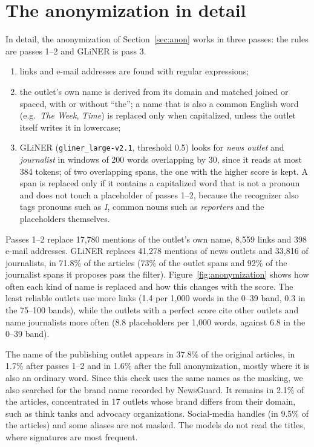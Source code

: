 \documentclass[11pt,a4paper]{article}
\begin{document}
\section{The anonymization in detail}\label{app:anonfig}
In detail, the anonymization of Section~\ref{sec:anon} works in three passes: the rules are passes 1--2 and GLiNER is
pass 3.
\begin{enumerate}
  \item links and e-mail addresses are found with regular expressions;
  \item the outlet's own name is derived from its domain and matched joined or spaced, with or without ``the''; a name
        that is also a common English word (e.g.\ \emph{The Week}, \emph{Time}) is replaced only when capitalized, unless
        the outlet itself writes it in lowercase;
  \item GLiNER (\texttt{gliner\_large-v2.1}, threshold 0.5) looks for \emph{news outlet} and \emph{journalist} in windows
        of 200 words overlapping by 30, since it reads at most 384 tokens; of two overlapping spans, the one with the
        higher score is kept. A span is replaced only if it contains a capitalized word that is not a pronoun and does
        not touch a placeholder of passes 1--2, because the recognizer also tags pronouns such as \emph{I}, common nouns
        such as \emph{reporters} and the placeholders themselves.
\end{enumerate}
Passes 1--2 replace 17,780 mentions of the outlet's own name, 8,559 links and 398 e-mail addresses. GLiNER replaces
41,278 mentions of news outlets and 33,816 of journalists, in 71.8\% of the articles (73\% of the outlet spans and 92\%
of the journalist spans it proposes pass the filter). Figure~\ref{fig:anonymization} shows how often each kind of name is replaced and how this changes with the score. The least reliable outlets use more links (1.4 per 1,000 words in the 0--39 band, 0.3
in the 75--100 bands), while the outlets with a perfect score cite other outlets and name journalists more often (8.8
placeholders per 1,000 words, against 6.8 in the 0--39 band).

The name of the publishing outlet appears in 37.8\% of the original articles, in 1.7\% after passes 1--2 and in 1.6\%
after the full anonymization, mostly where it is also an ordinary word. Since this check uses the same names as the
masking, we also searched for the brand name recorded by NewsGuard. It remains in 2.1\% of the articles, concentrated in
17 outlets whose brand differs from their domain, such as think tanks and advocacy organizations. Social-media handles
(in 9.5\% of the articles) and some aliases are not masked. The models do not read the titles, where signatures are most
frequent.
\end{document}
